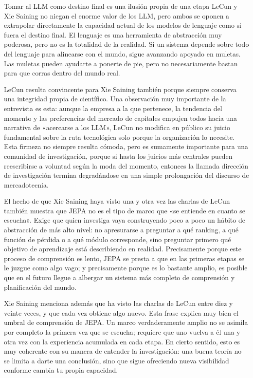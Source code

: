 \begin{warningbox}{Tomar al LLM como destino final es una ilusión propia de una etapa}
LeCun y Xie Saining no niegan el enorme valor de los LLM, pero ambos se oponen a extrapolar directamente la capacidad actual de los modelos de lenguaje como si fuera el destino final. El lenguaje es una herramienta de abstracción muy poderosa, pero no es la totalidad de la realidad. Si un sistema depende sobre todo del lenguaje para alinearse con el mundo, sigue avanzando apoyado en muletas. Las muletas pueden ayudarte a ponerte de pie, pero no necesariamente bastan para que corras dentro del mundo real.
\end{warningbox}

LeCun resulta convincente para Xie Saining también porque siempre conserva una integridad propia de científico. Una observación muy importante de la entrevista es esta: aunque la empresa a la que pertenece, la tendencia del momento y las preferencias del mercado de capitales empujen todos hacia una narrativa de «acercarse a los LLM», LeCun no modifica en público su juicio fundamental sobre la ruta tecnológica solo porque la organización lo necesite. Esta firmeza no siempre resulta cómoda, pero es sumamente importante para una comunidad de investigación, porque si hasta los juicios más centrales pueden reescribirse a voluntad según la moda del momento, entonces la llamada dirección de investigación termina degradándose en una simple prolongación del discurso de mercadotecnia.

El hecho de que Xie Saining haya visto una y otra vez las charlas de LeCun también muestra que JEPA no es el tipo de marco que «se entiende en cuanto se escucha». Exige que quien investiga vaya construyendo poco a poco un hábito de abstracción de más alto nivel: no apresurarse a preguntar a qué ranking, a qué función de pérdida o a qué módulo corresponde, sino preguntar primero qué objetivo de aprendizaje está describiendo en realidad. Precisamente porque este proceso de comprensión es lento, JEPA se presta a que en las primeras etapas se le juzgue como algo vago; y precisamente porque es lo bastante amplio, es posible que en el futuro llegue a albergar un sistema más completo de comprensión y planificación del mundo.

Xie Saining menciona además que ha visto las charlas de LeCun entre diez y veinte veces, y que cada vez obtiene algo nuevo. Esta frase explica muy bien el umbral de comprensión de JEPA. Un marco verdaderamente amplio no se asimila por completo la primera vez que se escucha; requiere que uno vuelva a él una y otra vez con la experiencia acumulada en cada etapa. En cierto sentido, esto es muy coherente con su manera de entender la investigación: una buena teoría no se limita a darte una conclusión, sino que sigue ofreciendo nueva visibilidad conforme cambia tu propia capacidad.

